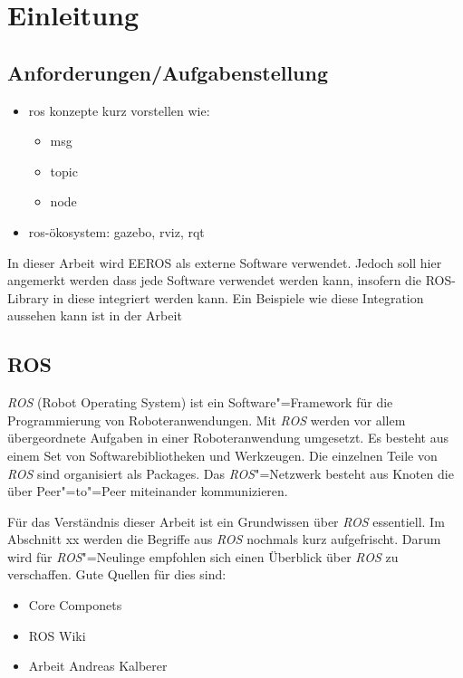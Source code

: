 \chapter{Einleitung}

\section{Anforderungen/Aufgabenstellung}

\begin{itemize}
\item ros konzepte kurz vorstellen wie:
	\begin{itemize}
	\item msg
	\item topic
	\item node
	\end{itemize}
\item ros-ökosystem: gazebo, rviz, rqt
\end{itemize}

In dieser Arbeit wird EEROS als externe Software verwendet.
Jedoch soll hier angemerkt werden dass jede Software verwendet werden kann, insofern die ROS-Library in diese integriert werden kann.
Ein Beispiele wie diese Integration aussehen kann ist in der Arbeit %


\section{ROS}
\textit{ROS} (Robot Operating System) ist ein Software"=Framework für die Programmierung von Roboteranwendungen.
Mit \textit{ROS} werden vor allem übergeordnete Aufgaben in einer Roboteranwendung umgesetzt.
Es besteht aus einem Set von Softwarebibliotheken und Werkzeugen.
Die einzelnen Teile von \textit{ROS} sind organisiert als Packages.
Das \textit{ROS}"=Netzwerk besteht aus Knoten die über Peer"=to"=Peer miteinander kommunizieren.

Für das Verständnis dieser Arbeit ist ein Grundwissen über \textit{ROS} essentiell.
Im Abschnitt xx werden die Begriffe aus \textit{ROS} nochmals kurz aufgefrischt. %
Darum wird für \textit{ROS}"=Neulinge empfohlen sich einen Überblick über \textit{ROS} zu verschaffen.
Gute Quellen für dies sind:
\begin{itemize}
\item Core Componets %
\item ROS Wiki
\item Arbeit Andreas Kalberer
\end{itemize}



